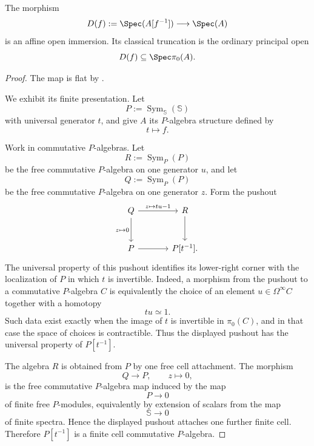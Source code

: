 \begin{proposition}
\label{prop:principal-spectral-open}
The morphism
\[
    D(f)
    :=
    \Spec(A[f^{-1}])
    \longrightarrow
    \Spec(A)
\]
is an affine open immersion. Its classical truncation is the ordinary
principal open
\[
    D(f)
    \subseteq
    \Spec\pi_0(A).
\]
\end{proposition}
\begin{proof}
The map is flat by
.

We exhibit its finite presentation. Let
\[
    P
    :=
    \operatorname{Sym}_{\mathbb S}(\mathbb S)
\]
with universal generator \(t\), and give \(A\) its \(P\)-algebra
structure defined by
\[
    t
    \longmapsto
    f.
\]

Work in commutative \(P\)-algebras. Let
\[
    R
    :=
    \operatorname{Sym}_{P}(P)
\]
be the free commutative \(P\)-algebra on one generator \(u\), and let
\[
    Q
    :=
    \operatorname{Sym}_{P}(P)
\]
be the free commutative \(P\)-algebra on one generator \(z\). Form the
pushout
\[
\begin{tikzcd}[column sep=large, row sep=large]
    Q
        \arrow[r, "{z\mapsto tu-1}"]
        \arrow[d, "{z\mapsto0}"']
    &
    R
        \arrow[d]
    \\
    P
        \arrow[r]
    &
    P[t^{-1}].
\end{tikzcd}
\]
The universal property of this pushout identifies its lower-right
corner with the localization of \(P\) in which \(t\) is invertible.
Indeed, a morphism from the pushout to a commutative \(P\)-algebra \(C\)
is equivalently the choice of an element \(u\in\Omega^\infty C\)
together with a homotopy
\[
    tu
    \simeq
    1.
\]
Such data exist exactly when the image of \(t\) is invertible in
\(\pi_0(C)\), and in that case the space of choices is contractible.
Thus the displayed pushout has the universal property of \(P[t^{-1}]\).

The algebra \(R\) is obtained from \(P\) by one free cell attachment.
The morphism
\[
    Q
    \longrightarrow
    P,
    \qquad
    z\longmapsto0,
\]
is the free commutative \(P\)-algebra map induced by the map
\[
    P
    \longrightarrow
    0
\]
of finite free \(P\)-modules, equivalently by extension of scalars from
the map
\[
    \mathbb S
    \longrightarrow
    0
\]
of finite spectra. Hence the displayed pushout attaches one further
finite cell. Therefore \(P[t^{-1}]\) is a finite cell commutative
\(P\)-algebra.


\end{proof}

